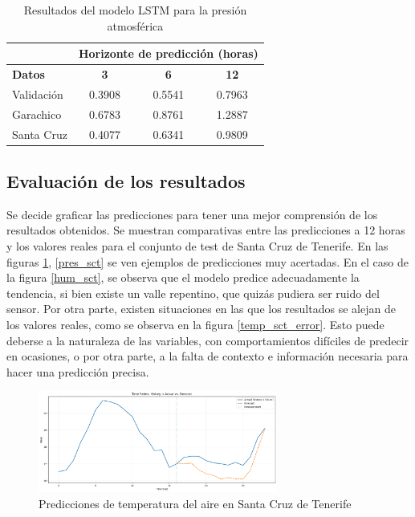 \begin{table}[h!]
\centering
\begin{tabular}{|l|c|c|c|}
\hline
\multicolumn{1}{|c|}{} & \multicolumn{3}{c|}{\textbf{Horizonte de predicción (horas)}} \\
\hline
\textbf{Datos} & \textbf{3} & \textbf{6} & \textbf{12} \\
\hline
Validación   &   0.3908           &    0.5541        &   0.7963          \\
\hline
Garachico    & 0.6783             &     0.8761       &     1.2887               \\
\hline
Santa Cruz &    0.4077            &     0.6341       &    0.9809                 \\
\hline
\end{tabular}
\caption{Resultados del modelo LSTM para la presión atmosférica}
\label{pres_results}
\end{table}


\subsection{Evaluación de los resultados}
Se decide graficar las predicciones para tener una mejor comprensión de los resultados obtenidos. Se muestran comparativas entre las predicciones a 12 horas y los valores
reales para el conjunto de test de Santa Cruz de Tenerife. En las figuras \ref{temp_sct}, \ref{pres_sct} se ven ejemplos de predicciones muy acertadas. 
En el caso de la figura \ref{hum_sct}, se observa que el modelo predice adecuadamente la tendencia, si bien existe un valle repentino, que quizás pudiera ser ruido del sensor.
Por otra parte, existen situaciones en las que los resultados se alejan de los valores reales, como se observa en la figura \ref{temp_sct_error}. Esto puede deberse
a la naturaleza de las variables, con comportamientos difíciles de predecir en ocasiones, o por otra parte, a la falta de contexto e información necesaria para hacer una predicción precisa.

\begin{figure}
    \centering
    \includegraphics[width=0.7\textwidth]{images/grafico_f12_temp.png}
    \caption{Predicciones de temperatura del aire en Santa Cruz de Tenerife}
    \label{temp_sct}
\end{figure}

